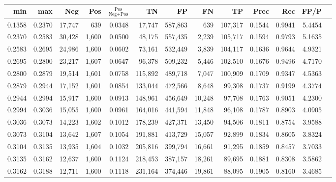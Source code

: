\begin{tabular}{rrrrrrrrrrrrr}
\toprule
   min &    max &    Neg &   Pos & $\frac{\text{Pos}}{\text{Neg}+\text{Pos}}$ &      TN &      FP &      FN &      TP &   Prec &    Rec &   FP/P \\
\midrule
0.1358 & 0.2370 & 17,747 &   639 &                                     0.0348 &  17,747 & 587,863 &     639 & 107,317 & 0.1544 & 0.9941 & 5.4454 \\
0.2370 & 0.2583 & 30,428 & 1,600 &                                     0.0500 &  48,175 & 557,435 &   2,239 & 105,717 & 0.1594 & 0.9793 & 5.1635 \\
0.2583 & 0.2695 & 24,986 & 1,600 &                                     0.0602 &  73,161 & 532,449 &   3,839 & 104,117 & 0.1636 & 0.9644 & 4.9321 \\
0.2695 & 0.2800 & 23,217 & 1,607 &                                     0.0647 &  96,378 & 509,232 &   5,446 & 102,510 & 0.1676 & 0.9496 & 4.7170 \\
0.2800 & 0.2879 & 19,514 & 1,601 &                                     0.0758 & 115,892 & 489,718 &   7,047 & 100,909 & 0.1709 & 0.9347 & 4.5363 \\
0.2879 & 0.2944 & 17,152 & 1,601 &                                     0.0854 & 133,044 & 472,566 &   8,648 &  99,308 & 0.1737 & 0.9199 & 4.3774 \\
0.2944 & 0.2994 & 15,917 & 1,600 &                                     0.0913 & 148,961 & 456,649 &  10,248 &  97,708 & 0.1763 & 0.9051 & 4.2300 \\
0.2994 & 0.3036 & 15,055 & 1,600 &                                     0.0961 & 164,016 & 441,594 &  11,848 &  96,108 & 0.1787 & 0.8903 & 4.0905 \\
0.3036 & 0.3073 & 14,223 & 1,602 &                                     0.1012 & 178,239 & 427,371 &  13,450 &  94,506 & 0.1811 & 0.8754 & 3.9588 \\
0.3073 & 0.3104 & 13,642 & 1,607 &                                     0.1054 & 191,881 & 413,729 &  15,057 &  92,899 & 0.1834 & 0.8605 & 3.8324 \\
0.3104 & 0.3135 & 13,935 & 1,604 &                                     0.1032 & 205,816 & 399,794 &  16,661 &  91,295 & 0.1859 & 0.8457 & 3.7033 \\
0.3135 & 0.3162 & 12,637 & 1,600 &                                     0.1124 & 218,453 & 387,157 &  18,261 &  89,695 & 0.1881 & 0.8308 & 3.5862 \\
0.3162 & 0.3188 & 12,711 & 1,600 &                                     0.1118 & 231,164 & 374,446 &  19,861 &  88,095 & 0.1905 & 0.8160 & 3.4685 \\

\end{tabular}
